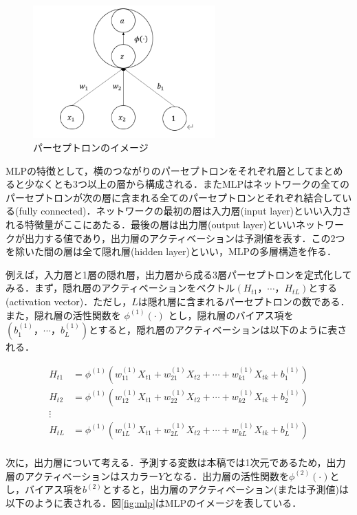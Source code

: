 \documentclass[a4paper，12pt]{jsarticle}
\begin{document}
\begin{figure}
  \centering
  \caption{パーセプトロンのイメージ}
  \label{fig:perceptron}
  \includegraphics[width=7cm]{./img/_ann_unit.png}
\end{figure}

MLPの特徴として，横のつながりのパーセプトロンをそれぞれ層としてまとめると少なくとも3つ以上の層から構成される．またMLPはネットワークの全てのパーセプトロンが次の層に含まれる全てのパーセプトロンとそれぞれ結合している(fully connected)．ネットワークの最初の層は入力層(input layer)といい入力される特徴量がここにあたる．最後の層は出力層(output layer)といいネットワークが出力する値であり，出力層のアクティベーションは予測値を表す．この2つを除いた間の層は全て隠れ層(hidden layer)といい，MLPの多層構造を作る．

例えば，入力層と1層の隠れ層，出力層から成る3層パーセプトロンを定式化してみる．まず，隠れ層のアクティベーションをベクトル$(H_{t1}，\cdots，H_{tL})$とする(activation vector)．ただし，$L$は隠れ層に含まれるパーセプトロンの数である．また，隠れ層の活性関数を $\phi^{(1)}(\cdot)$ とし，隠れ層のバイアス項を$(b^{(1)}_1，\cdots，b^{(1)}_L)$とすると，隠れ層のアクティベーションは以下のように表される．

\begin{equation}
  \begin{split}
    H_{t1} &= \phi^{(1)}(w^{(1)}_{11} X_{t1} + w^{(1)}_{21} X_{t2} + \cdots + w^{(1)}_{k1} X_{tk} + b^{(1)}_1) \\
    H_{t2} &= \phi^{(1)}(w^{(1)}_{12} X_{t1} + w^{(1)}_{22} X_{t2} + \cdots + w^{(1)}_{k2} X_{tk} + b^{(1)}_2) \\
    \vdots \\
    H_{tL} &= \phi^{(1)}(w^{(1)}_{1L} X_{t1} + w^{(1)}_{2L} X_{t2} + \cdots + w^{(1)}_{kL} X_{tk} + b^{(1)}_L) \\
  \end{split}
\end{equation}

 次に，出力層について考える．予測する変数は本稿では1次元であるため，出力層のアクティベーションはスカラー$Y$となる．出力層の活性関数を$\phi^{(2)}(\cdot)$とし，バイアス項を$b^{(2)}$とすると，出力層のアクティベーション(または予測値)は以下のように表される．図\ref{fig:mlp}はMLPのイメージを表している．
\end{document}
